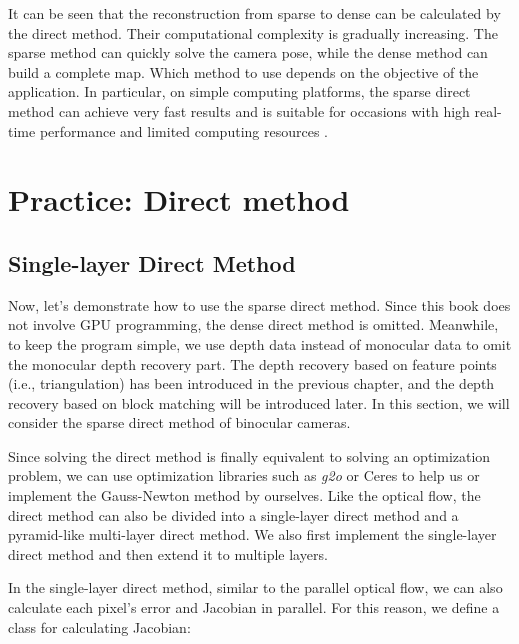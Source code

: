 It can be seen that the reconstruction from sparse to dense can be calculated by the direct method. Their computational complexity is gradually increasing. The sparse method can quickly solve the camera pose, while the dense method can build a complete map. Which method to use depends on the objective of the application. In particular, on simple computing platforms, the sparse direct method can achieve very fast results and is suitable for occasions with high real-time performance and limited computing resources {\cite{Engel2016}}.

\section{Practice: Direct method}
\subsection{Single-layer Direct Method}
Now, let's demonstrate how to use the sparse direct method. Since this book does not involve GPU programming, the dense direct method is omitted. Meanwhile, to keep the program simple, we use depth data instead of monocular data to omit the monocular depth recovery part. The depth recovery based on feature points (i.e., triangulation) has been introduced in the previous chapter, and the depth recovery based on block matching will be introduced later. In this section, we will consider the sparse direct method of binocular cameras.

Since solving the direct method is finally equivalent to solving an optimization problem, we can use optimization libraries such as \textit{g2o} or Ceres to help us or implement the Gauss-Newton method by ourselves. Like the optical flow, the direct method can also be divided into a single-layer direct method and a pyramid-like multi-layer direct method. We also first implement the single-layer direct method and then extend it to multiple layers.

In the single-layer direct method, similar to the parallel optical flow, we can also calculate each pixel's error and Jacobian in parallel. For this reason, we define a class for calculating Jacobian:

